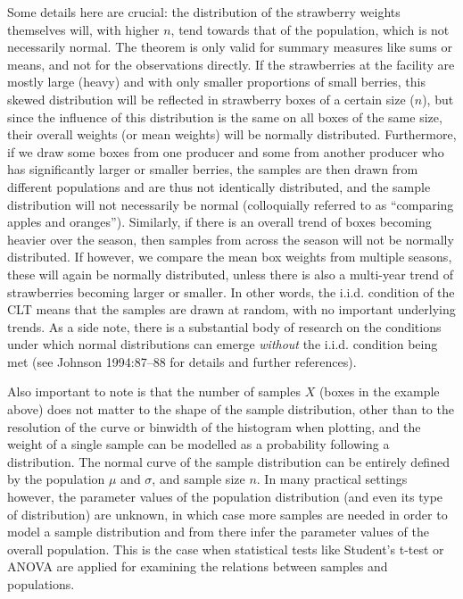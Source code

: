 \documentclass[
  12pt,
]{book}
\begin{document}
Some details here are crucial: the distribution of the strawberry weights themselves will, with higher \(n\), tend towards that of the population, which is not necessarily normal. The theorem is only valid for summary measures like sums or means, and not for the observations directly. If the strawberries at the facility are mostly large (heavy) and with only smaller proportions of small berries, this skewed distribution will be reflected in strawberry boxes of a certain size (\(n\)), but since the influence of this distribution is the same on all boxes of the same size, their overall weights (or mean weights) will be normally distributed. Furthermore, if we draw some boxes from one producer and some from another producer who has significantly larger or smaller berries, the samples are then drawn from different populations and are thus not identically distributed, and the sample distribution will not necessarily be normal (colloquially referred to as ``comparing apples and oranges''). Similarly, if there is an overall trend of boxes becoming heavier over the season, then samples from across the season will not be normally distributed. If however, we compare the mean box weights from multiple seasons, these will again be normally distributed, unless there is also a multi-year trend of strawberries becoming larger or smaller. In other words, the i.i.d. condition of the CLT means that the samples are drawn at random, with no important underlying trends. As a side note, there is a substantial body of research on the conditions under which normal distributions can emerge \emph{without} the i.i.d. condition being met (see Johnson 1994:87--88 for details and further references).

Also important to note is that the number of samples \(X\) (boxes in the example above) does not matter to the shape of the sample distribution, other than to the resolution of the curve or binwidth of the histogram when plotting, and the weight of a single sample can be modelled as a probability following a distribution. The normal curve of the sample distribution can be entirely defined by the population \(\mu\) and \(\sigma\), and sample size \(n\). In many practical settings however, the parameter values of the population distribution (and even its type of distribution) are unknown, in which case more samples are needed in order to model a sample distribution and from there infer the parameter values of the overall population. This is the case when statistical tests like Student's t-test or ANOVA are applied for examining the relations between samples and populations.
\end{document}
